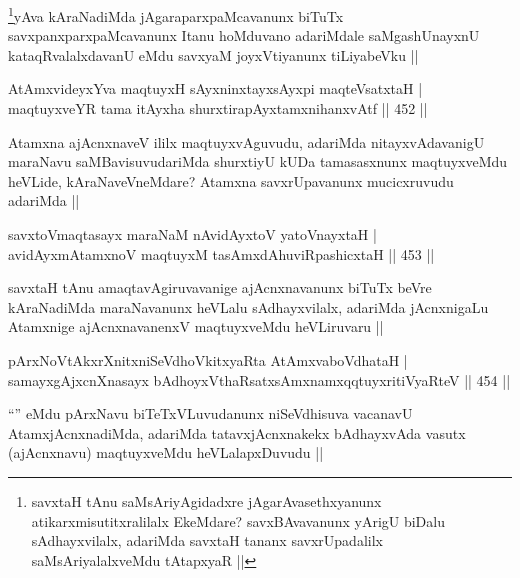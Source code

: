\begin{artha}
\footnote{savxtaH tAnu saMsAriyAgidadxre jAgarAvasethxyanunx atikarxmisutitxralilalx EkeMdare? savxBAvavanunx yArigU biDalu sAdhayxvilalx, adariMda savxtaH tananx savxrUpadalilx saMsAriyalalxveMdu tAtapxyaR ||}yAva kAraNadiMda jAgaraparxpaMcavanunx biTuTx savxpanxparxpaMcavanunx Itanu hoMduvano adariMdale saMgashUnayxnU kataqRvalalxdavanU eMdu savxyaM joyxVtiyanunx tiLiyabeVku ||
\end{artha}


\begin{shl}
AtAmxvideyxYva maqtuyxH sAyxninxtayxsAyxpi maqteVsatxtaH | \\
maqtuyxveYR tama itAyxha shurxtirapAyxtamxnihanxvAtf \hfill||  452 || 
\end{shl}

\begin{artha}
Atamxna ajAcnxnaveV ililx maqtuyxvAguvudu, adariMda nitayxvAdavanigU maraNavu saMBavisuvudariMda shurxtiyU kUDa tamasasxnunx maqtuyxveMdu heVLide, kAraNaveVneMdare? Atamxna savxrUpavanunx mucicxruvudu adariMda ||
\end{artha}

\begin{shl}
savxtoVmaqtasayx maraNaM nAvidAyxtoV yatoV\s nayxtaH | \\
avidAyxmAtamxnoV maqtuyxM tasAmxdAhuviRpashicxtaH \hfill||  453 ||  
\end{shl}

\begin{artha}
savxtaH tAnu amaqtavAgiruvavanige ajAcnxnavanunx biTuTx beVre kAraNadiMda maraNavanunx heVLalu sAdhayxvilalx, adariMda jAcnxnigaLu Atamxnige ajAcnxnavanenxV maqtuyxveMdu heVLiruvaru ||
\end{artha}


\begin{shl}
pArxNoVtAkxrXnitxniSeVdhoVkitxyaRta AtAmxvaboVdhataH | \\
samayxgAjxcnXnasayx bAdhoyxV\s thaRsatxsAmxnamxqqtuyxritiVyaRteV \hfill||  454 ||  
\end{shl}

\begin{artha}
``\stext'' eMdu pArxNavu biTeTxVLuvudanunx niSeVdhisuva vacanavU AtamxjAcnxnadiMda, adariMda tatavxjAcnxnakekx bAdhayxvAda vasutx (ajAcnxnavu) maqtuyxveMdu heVLalapxDuvudu ||
\end{artha}

